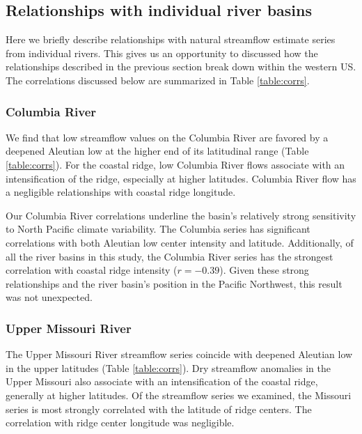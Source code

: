 \documentclass[final, double]{ua-thesis}
\begin{document}
\subsection{Relationships with individual river basins}

Here we briefly describe relationships with natural streamflow estimate series from individual rivers. This gives us an opportunity to discussed how the relationships described in the previous section break down within the western US.%
 The correlations discussed below are summarized in Table \ref{table:corrs}.

\subsubsection{Columbia River}

We find that low streamflow values on the Columbia River are favored by a deepened Aleutian low at the higher end of its latitudinal range (Table \ref{table:corrs}). For the coastal ridge, low Columbia River flows associate with an intensification of the ridge, especially at higher latitudes. Columbia River flow has a negligible relationships with coastal ridge longitude.

Our Columbia River correlations underline the basin's relatively strong sensitivity to North Pacific climate variability. The Columbia series has significant correlations with both Aleutian low center intensity and latitude. Additionally, of all the river basins in this study, the Columbia River series has the strongest correlation with coastal ridge intensity ($r = -0.39$). Given these strong relationships and the river basin's position in the Pacific Northwest, this result was not unexpected.

\subsubsection{Upper Missouri River}

The Upper Missouri River streamflow series coincide with deepened Aleutian low in the upper latitudes (Table \ref{table:corrs}). Dry streamflow anomalies in the Upper Missouri also associate with an intensification of the coastal ridge, generally at higher latitudes. Of the streamflow series we examined, the Missouri series is most strongly correlated with the latitude of ridge centers. The correlation with ridge center longitude was negligible.
\end{document}

